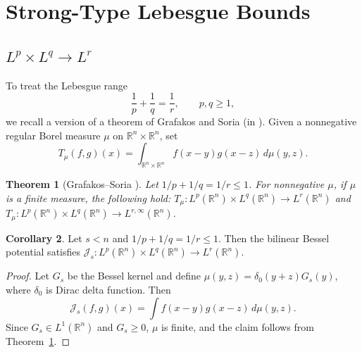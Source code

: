 \documentclass[12pt]{article}
\newtheorem{theorem}{Theorem}[section]
\theoremstyle{definition}
\newtheorem{corollary}[theorem]{Corollary}
\theoremstyle{remark}
\numberwithin{equation}{section}
\begin{document}
\section{Strong-Type Lebesgue Bounds}
\subsection{\textbf{$L^p\times L^q\to L^r$}}


To treat the Lebesgue range
\[
\frac1p+\frac1q=\frac1r,\qquad p,q\ge1,
\]
we recall a version of a theorem of Grafakos and Soria (in \cite{GraSor}).  
Given a nonnegative regular Borel measure $\mu$ on $\mathbb{R}^n\times\mathbb{R}^n$, set
\[
T_\mu(f,g)(x)
=
\int_{\mathbb{R}^n\times\mathbb{R}^n}
f(x-y)g(x-z)\,d\mu(y,z).
\]

\begin{theorem}[Grafakos--Soria {\cite{GraSor}}]\label{thm:grafakos-soria}
Let $1/p+1/q=1/r\leq1$. For nonnegative $\mu$, if $\mu$ is a finite measure, the following hold:
 $T_\mu:L^p(\mathbb{R}^n)\times L^q(\mathbb{R}^n)\to L^r(\mathbb{R}^n)$ and
 $T_\mu:L^p(\mathbb{R}^n)\times L^q(\mathbb{R}^n)\to L^{r,\infty}(\mathbb{R}^n)$.

\end{theorem}

\begin{corollary}\label{cor:bessel-strong}
Let $s<n$ and $1/p+1/q=1/r\le1$. Then the bilinear Bessel potential satisfies
$\mathcal J_s:
L^p(\mathbb{R}^n)\times L^q(\mathbb{R}^n)
\longrightarrow
L^r(\mathbb{R}^n)$.
\end{corollary}

\begin{proof}
Let $G_s$ be the Bessel kernel and define $\mu(y,z)=\delta_0(y+z)G_s(y)$, where $\delta_0$ is Dirac delta function. Then
\[
\mathcal J_s(f,g)(x)
=
\int f(x-y)g(x-z)\,d\mu(y,z).
\]
Since $G_s\in L^1(\mathbb{R}^n)$ and $G_s\ge0$, $\mu$ is finite, and the claim follows from Theorem~\ref{thm:grafakos-soria}.\end{proof}
\end{document}
